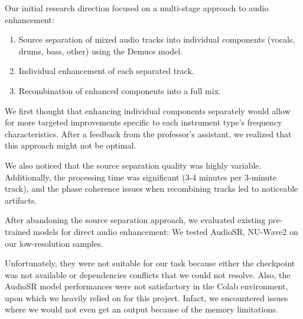 \documentclass{article}
\begin{document}
Our initial research direction focused on a multi-stage approach to audio enhancement:
\begin{enumerate}
    \item Source separation of mixed audio tracks into individual components (vocals, drums, bass, other) using the Demucs \cite{rouard2022hybrid} model.
    \item Individual enhancement of each separated track.
    \item Recombination of enhanced components into a full mix.
\end{enumerate}
We first thought that enhancing individual components separately would allow for more targeted improvements specific to each instrument type's frequency characteristics.
After a feedback from the professor's assistant, we realized that this approach might not be optimal.

We also noticed that the source separation quality was highly variable. Additionally, the processing time was significant (3-4 minutes per 3-minute track), and the phase coherence issues when recombining tracks led to noticeable artifacts.

After abandoning the source separation approach, we evaluated existing pre-trained models for direct audio enhancement:
We tested AudioSR, NU-Wave2 on our low-resolution samples.

Unfortunately, they were not suitable for our task because either the checkpoint was not available or dependencies conflicts that we could not resolve.
Also, the AudioSR model performances were not satisfactory in the Colab environment, upon which we heavily relied on for this project.
Infact, we encountered issues where we would not even get an output because of the memory limitations.
\end{document}

